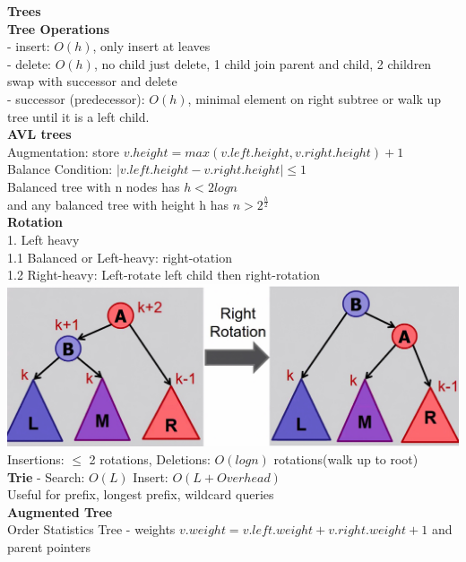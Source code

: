 \documentclass[10pt, a4paper]{article}
\begin{document}
\begin{multicols*}{3}
		{\normalsize\textbf{Trees}}\\
		\textbf{Tree Operations}\\
		- insert: $O(h)$, only insert at leaves\\
		- delete: $O(h)$, no child just delete, 1 child join parent and child, 2 children swap with successor and delete\\
		- successor (predecessor): $O(h)$, minimal element on right subtree or walk up tree until it is a left child. \\
		\textbf{AVL trees}\\
		Augmentation: store $v.height = max(v.left.height, v.right.height) + 1$\\
		Balance Condition: $|v.left.height - v.right.height| \leq 1$\\
		Balanced tree with n nodes has
		$h < 2logn$\\ and any balanced tree with height h has $ n > 2^{\frac{h}{2}}$\\
		\textbf{Rotation}\\
		1. Left heavy\\
		1.1 Balanced or Left-heavy: right-otation\\
		1.2 Right-heavy: Left-rotate left child then right-rotation\\
		\includegraphics[scale=.07]{./assets/Rotation}\\
		Insertions: $\leq$ 2 rotations, Deletions: $O(logn)$ rotations(walk up to root)\\
		\textbf{Trie} - Search: $O(L)$ Insert: $O(L + Overhead)$\\
		Useful for prefix, longest prefix, wildcard queries\\
		\textbf{Augmented Tree}\\
		Order Statistics Tree - weights $v.weight = v.left.weight + v.right.weight + 1$ and parent pointers\\

\end{multicols*}
\end{document}
